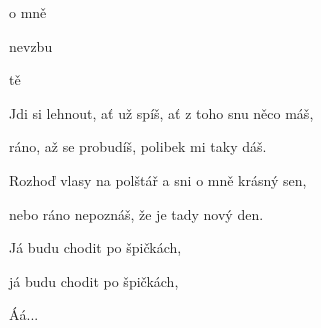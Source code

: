 

\zs
{} 

 

 o mně 

 
\ks

\zr
{} 

 nevzbu

 

 tě 
\kr

\zs
Jdi si lehnout, ať už spíš, ať z toho snu něco máš,

ráno, až se probudíš, polibek mi taky dáš.
\ks

\zr\kr

\zs
Rozhoď vlasy na polštář a sni o mně krásný sen,

nebo ráno nepoznáš, že je tady nový den.
\ks

Já budu chodit po špičkách,

já budu chodit po špičkách,

Áá...

\kp
